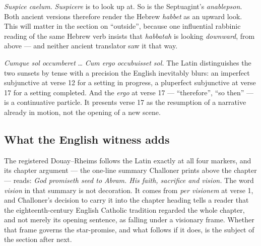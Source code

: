 \textit{Suspice caelum.} \textit{Suspicere} is to look up at. So is the
Septuagint's \textit{anablepson}. Both ancient versions therefore render the
Hebrew \textit{habbet} as an upward look. This will matter in the section on
``outside'', because one influential rabbinic reading of the same Hebrew verb
insists that \textit{habbatah} is looking \emph{downward}, from above --- and
neither ancient translator saw it that way.

\textit{Cumque sol occumberet} \dots{} \textit{Cum ergo occubuisset sol.} The
Latin distinguishes the two sunsets by tense with a precision the English
inevitably blurs: an imperfect subjunctive at verse 12 for a setting in
progress, a pluperfect subjunctive at verse 17 for a setting completed. And the
\textit{ergo} at verse 17 --- ``therefore'', ``so then'' --- is a continuative
particle. It presents verse 17 as the resumption of a narrative already in
motion, not the opening of a new scene.

\subsection{What the English witness adds}

The registered Douay--Rheims follows the Latin exactly at all four markers, and
its chapter argument --- the one-line summary Challoner prints above the
chapter --- reads: \emph{God promiseth seed to Abram. His faith, sacrifice and
vision.} The word \emph{vision} in that summary is not decoration. It comes from
\textit{per visionem} at verse 1, and Challoner's decision to carry it into the
chapter heading tells a reader that the eighteenth-century English Catholic
tradition regarded the whole chapter, and not merely its opening sentence, as
falling under a visionary frame. Whether that frame governs the star-promise,
and what follows if it does, is the subject of the section after next.

